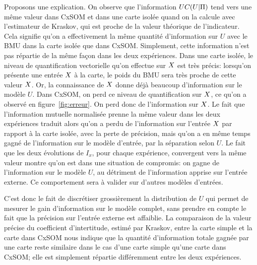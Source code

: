 \documentclass[../main]{subfiles}
\begin{document}
Proposons une explication.
On observe que l'information $UC(U|\Pi)$ tend vers une même valeur dans CxSOM et dans une carte isolée quand on la calcule avec l'estimateur de Kraskov, qui est proche de la valeur théorique de l'indicateur. Cela signifie qu'on a effectivement la même quantité d'information sur $U$ avec le BMU dans la carte isolée que dans CxSOM. Simplement, cette information n'est pas répartie de la même façon dans les deux expériences.
Dans une carte isolée, le niveau de quantification vectorielle qu'on effectue sur $X$ est très précis: lorsqu'on présente une entrée $X$ à la carte, le poids du BMU sera très proche de cette valeur $X$. Or, la connaissance de $X$ donne déjà beaucoup d'information sur le modèle $U$.
Dans CxSOM, on perd ce niveau de quantification sur $X$, ce qu'on a observé en figure~\ref{fig:erreur}. On perd donc de l'information sur $X$. 
Le fait que l'information mutuelle normalisée prenne la même valeur dans les deux expériences traduit alors qu'on a perdu de l'information sur l'entrée $X$ par rapport à la carte isolée, avec la perte de précision, mais qu'on a en même temps gagné de l'information sur le modèle d'entrée, par la séparation selon $U$. Le fait que les deux évolutions de $I_x$, pour chaque expérience, convergent vers la même valeur montre qu'on est dans une situation de compromis: on gagne de l'information sur le modèle $U$, au détriment de l'information apprise sur l'entrée externe.
Ce comportement sera à valider sur d'autres modèles d'entrées.

C'est donc le fait de discrétiser grossièrement la distribution de $U$ qui permet de mesurer le gain d'information sur le modèle complet, sans prendre en compte le fait que la précision sur l'entrée externe est affaiblie. 
La comparaison de la valeur précise du coefficient d'intertitude, estimé par Kraskov, entre la carte simple et la carte dans CxSOM nous indique que la quantité d'information totale gagnée par une carte reste similaire dans le cas d'une carte simple qu'une carte dans CxSOM; elle est simplement répartie différemment entre les deux expériences.
\end{document}
